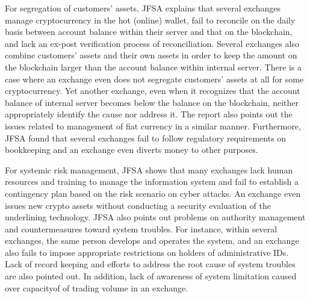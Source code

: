 For segregation of customers' assets, JFSA explains that several exchanges manage cryptocurrency in the hot (online) wallet, fail to reconcile on the daily basis between account balance within their server and that on the blockchain, and lack an ex-post verification process of reconciliation. Several exchanges also combine customers' assets and their own assets in order to keep the amount on the blockchain larger than the account balance within internal server. There is a case where an exchange even does not segregate customers' assets at all for some cryptocurrency. Yet another exchange, even when it recognizes that the account balance of internal server becomes below the balance on the blockchain, neither appropriately identify the cause nor address it. The report also points out the issues related to management of fiat currency in a similar manner. Furthermore, JFSA found that several exchanges fail to follow regulatory requirements on bookkeeping and an exchange even diverts money to other purposes.

For systemic risk management, JFSA shows that many exchanges lack human resources and training to manage the information system and fail to establish a contingency plan based on the risk scenario on cyber attacks. An exchange even issues new crypto assets without conducting a security evaluation of the underlining technology. JFSA also points out problems on authority management and countermeasures toward system troubles. For instance, within several exchanges, the same person develops and operates the system, and an exchange also fails to impose appropriate restrictions on holders of administrative IDs. Lack of record keeping and efforts to address the root cause of system troubles are also pointed out. In addition, lack of awareness of system limitation caused over capacityof of trading volume in an exchange.

